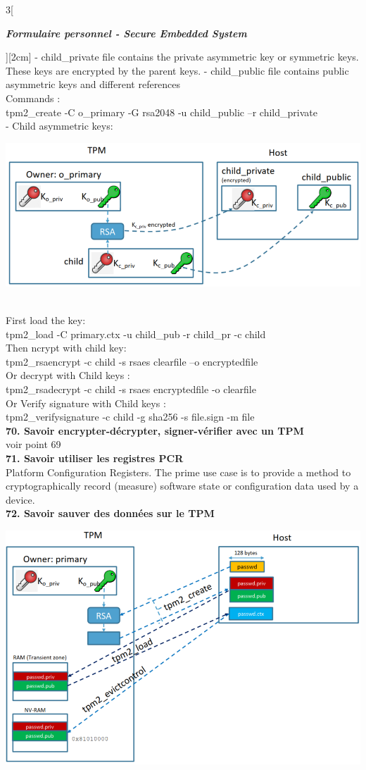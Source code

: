 \begin{multicols}{3}[\centerline{ \large\em \textbf{Formulaire personnel - Secure Embedded System}}][2cm]
- child\_private file contains the private asymmetric key or symmetric keys. These keys are encrypted by the parent keys. 
- child\_public file contains public asymmetric keys and different references\\
Commands :\\
tpm2\_create -C o\_primary -G rsa2048 -u child\_public –r child\_private\\
- Child asymmetric keys:\\
\begin{minipage}{\linewidth}
	\centering
    \includegraphics[width =0.4\columnwidth]{images/49.png}
\end{minipage}\\
First load the key:\\
tpm2\_load -C primary.ctx -u child\_pub -r child\_pr -c child\\
Then ncrypt with child key: \\
tpm2\_rsaencrypt -c child -s rsaes clearfile –o encryptedfile\\
Or decrypt with Child keys :\\
tpm2\_rsadecrypt -c child -s rsaes encryptedfile -o clearfile\\
Or Verify signature with Child keys :\\
tpm2\_verifysignature -c child -g sha256 -s file.sign -m file
\\ \textbf{70. Savoir encrypter-décrypter, signer-vérifier avec un TPM\\}
voir point 69\\ 
\textbf{71. Savoir utiliser les registres PCR\\}
Platform Configuration Registers. The prime use case is to provide a method to cryptographically record (measure) software state or configuration data used by a device. \\ 
\textbf{72. Savoir sauver des données sur le TPM\\}
\begin{minipage}{\linewidth}
	\centering
    \includegraphics[width =0.6\columnwidth]{images/50.png}

\end{minipage}
\end{multicols}
